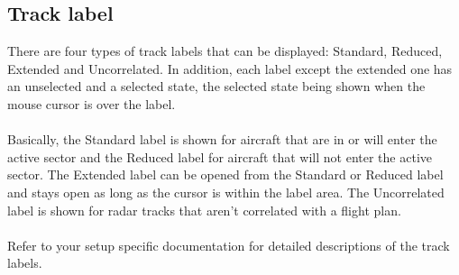 \documentclass[11pt,a4paper,oldfontcommands]{memoir}
\begin{document}
\subsection{Track label}
There are four types of track labels that can be displayed: Standard, Reduced, Extended and Uncorrelated.
In addition, each label except the extended one has an unselected and a selected state, the selected state
being shown when the mouse cursor is over the label.\\\\
Basically, the Standard label is shown for aircraft that are in or will enter the active sector and the Reduced
label for aircraft that will not enter the active sector. The Extended label can be opened from the Standard
or Reduced label and stays open as long as the cursor is within the label area. The Uncorrelated label is
shown for radar tracks that aren’t correlated with a flight plan.\\\\
Refer to your setup specific documentation for detailed descriptions of the track labels.\\
\end{document}
